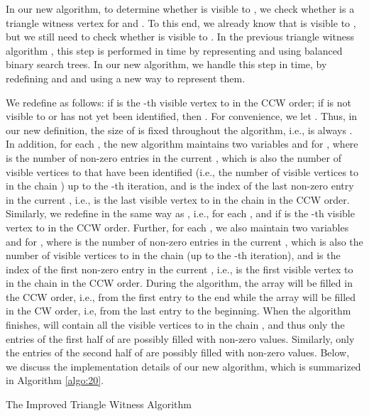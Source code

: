 \documentclass[11pt]{article}
\begin{document}
In our new algorithm, to determine whether  is visible
to , we check whether  is a triangle witness vertex for  and .
To this end, we already
know that  is visible to , but we still need to check whether 
is visible to . In the previous triangle witness algorithm
\cite{ref:DisserRe10}, this
step is performed in  time by representing  and  using
balanced binary search trees. In our new algorithm, we handle this
step in  time, by redefining  and  and using a new way to
represent them. 

We redefine  as follows: 
if  is the -th visible vertex to  in the CCW order; if
 is not visible to  or  has not yet been identified, 
then . For convenience, we let
. 
Thus, in our new definition, the size of
 is fixed throughout the algorithm, i.e.,  is always
. In
addition, for each , the new algorithm maintains two variables
 and  for , where  is the number of non-zero
entries in the current , which is also the number of visible
vertices to  that have been identified 
(i.e., the number of visible vertices to  
in the chain ) up to the -th iteration, 
and  is the index  
of the last non-zero entry in the current , i.e.,  is the
last visible vertex to  in the chain  in
the CCW order. 
Similarly, we redefine  in the same way as , i.e., for
each ,  and 
if  is the -th visible vertex to  in the CCW order.  
Further, for each , we also maintain 
two variables  and  for , where  is the
number of non-zero entries in the current , which is also the
number of visible vertices to  in the chain
 (up to the -th iteration), and  is the
index of the first non-zero entry in the current , i.e.,  
is the first visible vertex to  in the chain
 in the CCW order. During the
algorithm, the array  will be filled in the CCW order, i.e., 
from the first entry 
 to the end while the array  will be filled
in the CW order, i.e, from the last entry  to the
beginning. When the algorithm finishes,  will 
contain all the visible vertices to  in the chain
, and thus only the entries of the first half
of  are possibly filled with non-zero values.
Similarly, only the entries of the second half of  are possibly
filled with non-zero values. Below, we discuss the implementation details of
our new algorithm, which is summarized in Algorithm \ref{algo:20}. 


\begin{algorithm}[t]
\caption{The Improved Triangle Witness Algorithm}
\label{algo:20}
\BlankLine
{}
\;
\For{ \KwTo }{
\;
\;
}
\For{ \KwTo }{
\;
\;
\;
\;
}

\For{ \KwTo }{
\For{ \KwTo }{
\;
\;
\If{}{
\;
\;
\;
}
\If{}{
\;
\;
\;
, , ,
\;
}
}
}
\end{algorithm}
\end{document}

